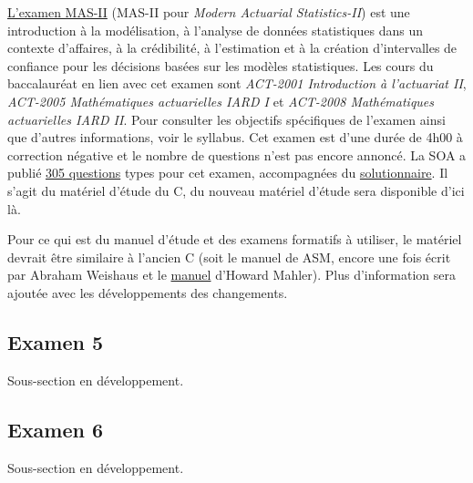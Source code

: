 \href{http://www.casact.org/admissions/syllabus/index.cfm?fa=MASII&parentID=392}{L'examen MAS-II} (MAS-II pour \textit{Modern Actuarial Statistics-II}) est une introduction à la modélisation, à l'analyse de données statistiques dans un contexte d'affaires, à la crédibilité, à l'estimation et à la création d'intervalles de confiance pour les décisions basées sur les modèles statistiques. Les cours du baccalauréat en lien avec cet examen sont \textit{ACT-2001 Introduction à l'actuariat II}, \textit{ACT-2005 Mathématiques actuarielles IARD I} et \textit{ACT-2008 Mathématiques actuarielles IARD II}. Pour consulter les objectifs spécifiques de l'examen ainsi que d'autres informations, voir le syllabus. Cet examen est d'une durée de 4h00 à correction négative et le nombre de questions n'est pas encore annoncé. La SOA a publié \href{http://www.soa.org/files/edu/edu-exam-c-sample-quest.pdf}{305 questions} types pour cet examen, accompagnées du \href{http://www.soa.org/files/edu/edu-exam-c-sample-sol.pdf}{solutionnaire}. Il s'agit du matériel d'étude du C, du nouveau matériel d'étude sera disponible d'ici là.\vspace{\baselineskip}

Pour ce qui est du manuel d'étude et des examens formatifs à utiliser, le matériel devrait être similaire à l'ancien C (soit le manuel de ASM, encore une fois écrit par Abraham Weishaus et le \href{http://howardmahler.com/Teaching/C.html}{manuel} d'Howard Mahler). Plus d'information sera ajoutée avec les développements des changements.\vspace{\baselineskip}

\subsection*{Examen 5}
\label{subsec:exam5}

Sous-section en développement. \vspace{\baselineskip}


\subsection*{Examen 6}
\label{subsec:exam6}

Sous-section en développement. \vspace{\baselineskip}


\newpage
